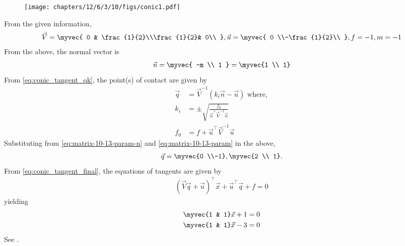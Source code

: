 	\begin{figure}[H]
		\centering
 \texttt{[image: chapters/12/6/3/10/figs/conic1.pdf]}
		\caption{}
		\label{fig:12/6/3/10}
  	\end{figure}
From the given information, 
\begin{align}
	\vec{V}
	=\myvec{
		0 & \frac{1}{2}\\\frac{1}{2}& 0\\
	},
\vec{u} = \myvec{
0 \\-\frac{1}{2}\\
},  f = -1, m=-1
	\label{eq:matrix-10-13-param}
\end{align}
From the above, the  normal vector is
\begin{align}
\vec{n}=\myvec{
-m \\ 1
	} = \myvec{1 \\ 1}
	\label{eq:matrix-10-13-param-n}
\end{align}
From 
\eqref{eq:conic_tangent_qk},
	the point(s) of contact are given by
\begin{align}
	\vec{q}&=\vec{V}^{-1}(k_i\vec{n}-\vec{u}) 
	\text{ where},\\
	k_i&=\pm \sqrt{\frac{f_0}{\vec{n}^{\top}\vec{V}^{-1}\vec{n}}}\\
	f_0&=f+\vec{u}^{\top}\vec{V}^{-1}\vec{u}
\end{align}
Substituting from 
	\eqref{eq:matrix-10-13-param-n}
	and
	\eqref{eq:matrix-10-13-param}
	in the above,
\begin{align}
\vec{q}=\myvec{0 \\-1}, \myvec{2 \\ 1}.
\end{align}
From 
  \eqref{eq:conic_tangent_final},
the equations of tangents are given by
\begin{align}
(\vec{V}\vec{q}+\vec{u})^{\top}\vec{x}+\vec{u}^{\top}\vec{q}+f=0
\end{align}
yielding
\begin{align}
	\myvec{1 & 1}\vec{x}+1&=0\\
\myvec{1 & 1}\vec{x}-3&=0\\
\end{align}
See 
		.
